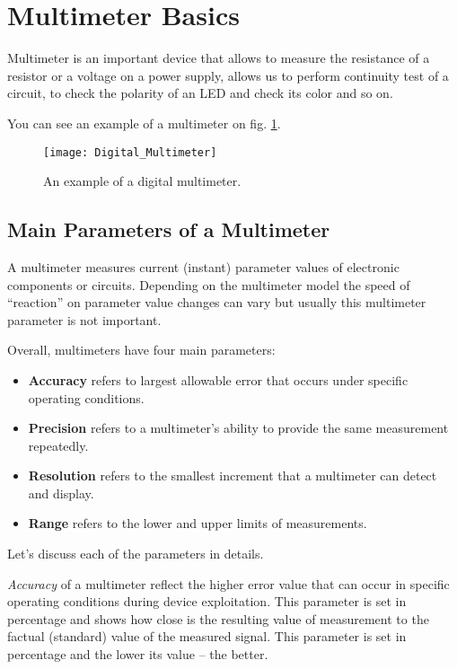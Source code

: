 \documentclass[../main.tex]{subfiles}
\begin{document}
\section{Multimeter Basics}

Multimeter is an important device that allows to measure the resistance of a
resistor or a voltage on a power supply, allows us to perform continuity test of
a circuit, to check the polarity of an LED and check its color and so on.

You can see an example of a multimeter on fig. \ref{fig:multimeter-example}.

\begin{figure}[ht]
  \centering
  \texttt{[image: Digital\_Multimeter]}
  \caption{An example of a digital multimeter.}
  \label{fig:multimeter-example}
\end{figure}

\subsection{Main Parameters of a Multimeter}

A multimeter measures current (instant) parameter values of electronic
components or circuits.  Depending on the multimeter model the speed of
``reaction'' on parameter value changes can vary but usually this multimeter
parameter is not important.

Overall, multimeters have four\cite{fluke:multimeter} main parameters:
\begin{itemize}
\item \textbf{Accuracy} refers to largest allowable error that occurs under
  specific operating conditions.
\item \textbf{Precision} refers to a multimeter's ability to provide the same
  measurement repeatedly.
\item \textbf{Resolution} refers to the smallest increment that a multimeter can
  detect and display.
\item \textbf{Range} refers to the lower and upper limits of measurements.
\end{itemize}

Let's discuss each of the parameters in details.

\emph{Accuracy} of a multimeter reflect the higher error value that can occur in
specific operating conditions during device exploitation.  This parameter is set
in percentage and shows how close is the resulting value of measurement to the
factual (standard) value of the measured signal.  This parameter is set in
percentage and the lower its value -- the better.
\end{document}
